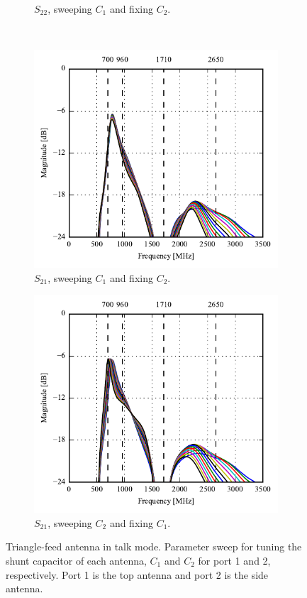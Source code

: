 \begin{figure}[htbp]
\begin{subfigure}[b]{0.49\linewidth}
        \caption{$S_{22}$, sweeping $C_1$ and fixing $C_2$.}
    \end{subfigure}
    \\
    \begin{subfigure}[b]{0.49\linewidth}
        \centering
        \includegraphics{img/tech_sol/trianglefeed/talk_mode/Csh1s21.pdf}
        \caption{$S_{21}$, sweeping $C_1$ and fixing $C_2$.}
    \end{subfigure}
    \hfill
    \begin{subfigure}[b]{0.49\linewidth}
        \centering
        \includegraphics{img/tech_sol/trianglefeed/talk_mode/Csh2s21.pdf}
        \caption{$S_{21}$, sweeping $C_2$ and fixing $C_1$.}
    \end{subfigure}
    \caption{Triangle-feed antenna in talk mode. Parameter sweep for tuning the shunt capacitor of each antenna, $C_1$ and $C_2$ for port 1 and 2, respectively. Port 1 is the top antenna and port 2 is the side antenna.}
    \label{fig:tiang_sparam_sweep_talk}
\end{figure}


